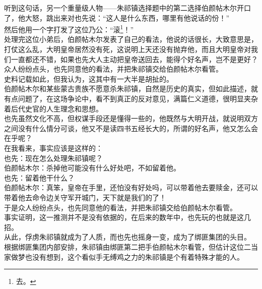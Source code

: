 \begin{multicols}{\theparacolNo}
听到这句话，另一个重量级人物——朱祁镇选择题中的第二选择伯颜帖木尔开口了，他大怒，跳出来对也先说：“这人是什么东西，哪里有他说话的份！”\\

然后他用一个字打发了这位乃公：“滚\footnote{去。}！”\\

处理完这位小弟后，伯颜帖木尔发表了自己的看法，他说的话很长，大致意思是，打仗这么乱，大明皇帝居然没有死，这说明上天还没有抛弃他，而且大明皇帝对我们一直都还不错，如果也先大人主动把皇帝送回去，能得个好名声，岂不是更好？\\

众人纷纷点头，也先同意他的看法，并把朱祁镇交给伯颜帖木尔看管。\\

史料记载如此，但我认为，这其中有一大半是胡扯的。\\

伯颜帖木尔和某些蒙古贵族不愿意杀朱祁镇，自然是历史的真实，但如此描述，就有点问题了，在这场争论中，看不到真正的反对意见，满篇仁义道德，很明显夹杂着后代史官的人生理念和思想。\\

也先虽然文化不高，但权谋手段还是懂得一些的，他既然与大明开战，就说明双方之间没有什么情分可谈，他又不是读四书五经长大的，所谓的好名声，他又怎么会在乎呢？\\

在我看来，事实应该是这样的：\\

也先：现在怎么处理朱祁镇呢？\\

伯颜帖木尔：杀掉他可能没有什么好处吧，不如留着他。\\

也先：留着他干什么？\\

伯颜帖木尔：真笨，皇帝在手里，还怕没有好处吗，可以带着他去要赎金，还可以带着他去命令边关守军开城门，天下就是我们的了！\\

于是众人纷纷点头，也先同意他的看法，并把朱祁镇交给伯颜帖木尔看管。\\

事实证明，这一推测并不是没有依据的，在后来的数年中，也先玩的也就是这几招。\\

从此，俘虏朱祁镇就成为了人质，而也先也摇身一变，成为了绑匪集团的头目。\\

根据绑匪集团内部安排，朱祁镇由绑匪第二把手伯颜帖木尔看管，但估计这位二当家做梦也没有想到，这个看似手无缚鸡之力的朱祁镇是个有着特殊才能的人。\\


\end{multicols}
